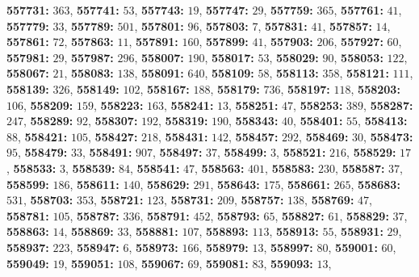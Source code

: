 \textsf{\bfseries 557731:} $363$, \textsf{\bfseries 557741:} $53$, \textsf{\bfseries 557743:} $19$, \textsf{\bfseries 557747:} $29$, \textsf{\bfseries 557759:} $365$, \textsf{\bfseries 557761:} $41$, \textsf{\bfseries 557779:} $33$, \textsf{\bfseries 557789:} $501$, \textsf{\bfseries 557801:} $96$, \textsf{\bfseries 557803:} $7$, \textsf{\bfseries 557831:} $41$, \textsf{\bfseries 557857:} $14$, \textsf{\bfseries 557861:} $72$, \textsf{\bfseries 557863:} $11$, \textsf{\bfseries 557891:} $160$, \textsf{\bfseries 557899:} $41$, \textsf{\bfseries 557903:} $206$, \textsf{\bfseries 557927:} $60$, \textsf{\bfseries 557981:} $29$, \textsf{\bfseries 557987:} $296$, \textsf{\bfseries 558007:} $190$, \textsf{\bfseries 558017:} $53$, \textsf{\bfseries 558029:} $90$, \textsf{\bfseries 558053:} $122$, \textsf{\bfseries 558067:} $21$, \textsf{\bfseries 558083:} $138$, \textsf{\bfseries 558091:} $640$, \textsf{\bfseries 558109:} $58$, \textsf{\bfseries 558113:} $358$, \textsf{\bfseries 558121:} $111$, \textsf{\bfseries 558139:} $326$, \textsf{\bfseries 558149:} $102$, \textsf{\bfseries 558167:} $188$, \textsf{\bfseries 558179:} $736$, \textsf{\bfseries 558197:} $118$, \textsf{\bfseries 558203:} $106$, \textsf{\bfseries 558209:} $159$, \textsf{\bfseries 558223:} $163$, \textsf{\bfseries 558241:} $13$, \textsf{\bfseries 558251:} $47$, \textsf{\bfseries 558253:} $389$, \textsf{\bfseries 558287:} $247$, \textsf{\bfseries 558289:} $92$, \textsf{\bfseries 558307:} $192$, \textsf{\bfseries 558319:} $190$, \textsf{\bfseries 558343:} $40$, \textsf{\bfseries 558401:} $55$, \textsf{\bfseries 558413:} $88$, \textsf{\bfseries 558421:} $105$, \textsf{\bfseries 558427:} $218$, \textsf{\bfseries 558431:} $142$, \textsf{\bfseries 558457:} $292$, \textsf{\bfseries 558469:} $30$, \textsf{\bfseries 558473:} $95$, \textsf{\bfseries 558479:} $33$, \textsf{\bfseries 558491:} $907$, \textsf{\bfseries 558497:} $37$, \textsf{\bfseries 558499:} $3$, \textsf{\bfseries 558521:} $216$, \textsf{\bfseries 558529:} $17$, \textsf{\bfseries 558533:} $3$, \textsf{\bfseries 558539:} $84$, \textsf{\bfseries 558541:} $47$, \textsf{\bfseries 558563:} $401$, \textsf{\bfseries 558583:} $230$, \textsf{\bfseries 558587:} $37$, \textsf{\bfseries 558599:} $186$, \textsf{\bfseries 558611:} $140$, \textsf{\bfseries 558629:} $291$, \textsf{\bfseries 558643:} $175$, \textsf{\bfseries 558661:} $265$, \textsf{\bfseries 558683:} $531$, \textsf{\bfseries 558703:} $353$, \textsf{\bfseries 558721:} $123$, \textsf{\bfseries 558731:} $209$, \textsf{\bfseries 558757:} $138$, \textsf{\bfseries 558769:} $47$, \textsf{\bfseries 558781:} $105$, \textsf{\bfseries 558787:} $336$, \textsf{\bfseries 558791:} $452$, \textsf{\bfseries 558793:} $65$, \textsf{\bfseries 558827:} $61$, \textsf{\bfseries 558829:} $37$, \textsf{\bfseries 558863:} $14$, \textsf{\bfseries 558869:} $33$, \textsf{\bfseries 558881:} $107$, \textsf{\bfseries 558893:} $113$, \textsf{\bfseries 558913:} $55$, \textsf{\bfseries 558931:} $29$, \textsf{\bfseries 558937:} $223$, \textsf{\bfseries 558947:} $6$, \textsf{\bfseries 558973:} $166$, \textsf{\bfseries 558979:} $13$, \textsf{\bfseries 558997:} $80$, \textsf{\bfseries 559001:} $60$, \textsf{\bfseries 559049:} $19$, \textsf{\bfseries 559051:} $108$, \textsf{\bfseries 559067:} $69$, \textsf{\bfseries 559081:} $83$, \textsf{\bfseries 559093:} $13$, 
